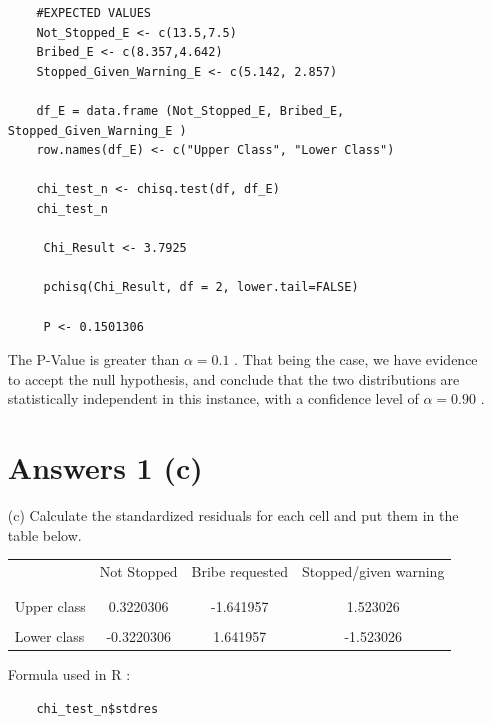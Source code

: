 \documentclass[12pt,letterpaper]{article}
\begin{document}
\begin{enumerate}
\begin{verbatim}
	#EXPECTED VALUES
	Not_Stopped_E <- c(13.5,7.5)
	Bribed_E <- c(8.357,4.642)
	Stopped_Given_Warning_E <- c(5.142, 2.857)
	
	df_E = data.frame (Not_Stopped_E, Bribed_E, Stopped_Given_Warning_E )
	row.names(df_E) <- c("Upper Class", "Lower Class")
	
	chi_test_n <- chisq.test(df, df_E)
	chi_test_n
	
	 Chi_Result <- 3.7925
	 
	 pchisq(Chi_Result, df = 2, lower.tail=FALSE)
	 
	 P <- 0.1501306
\end{verbatim}

The P-Value is greater than $\alpha = 0.1$ . That being the case, we have evidence to accept the null hypothesis, and conclude that the two distributions are statistically independent in this instance, with a confidence level of $\alpha = 0.90$ . \\

\newpage


\section*{Answers 1 (c)}

	\item [(c)] Calculate the standardized residuals for each cell and put them in the table below.
	\vspace{1cm}
	
	\begin{table}[h]
		\centering
		\begin{tabular}{l | c c c }
			& Not Stopped & Bribe requested & Stopped/given warning \\
			\\[-1.8ex] 
			\hline \\[-1.8ex]
			Upper class & 0.3220306 & -1.641957  & 1.523026  \\
			\\
			Lower class &   -0.3220306 & 1.641957 & -1.523026   \\
			
		\end{tabular}
	\end{table} 


Formula used in R :

\begin{verbatim}
	chi_test_n$stdres
\end{verbatim}

\newpage


\end{enumerate}
\end{document}
